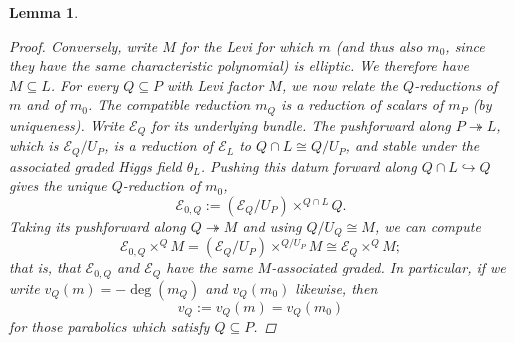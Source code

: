 \documentclass[openany]{amsbook}
\newtheorem{lemma}[theorem]{Lemma}
\theoremstyle{definition}
\theoremstyle{remark}
\numberwithin{equation}{section}
\newcommand{\cE}{\mathcal{E}}
\renewcommand{\-}{\operatorname{-}}
\begin{document}
\begin{lemma}
\begin{proof}
        Conversely, write $M$ for the Levi for which $m$ (and thus also $m_0$, since they have the same characteristic polynomial) is elliptic. We therefore have $M \subseteq L$. For every $Q \subseteq P$ with Levi factor $M$, we now relate the $Q$-reductions of $m$ and of $m_0$. The compatible reduction $m_Q$ is a reduction of scalars of $m_P$ (by uniqueness). Write $\cE_Q$ for its underlying bundle. The pushforward along $P \twoheadrightarrow L$, which is $\cE_Q/U_P$, is a reduction of $\cE_L$ to $Q \cap L \cong Q/U_P$, and stable under the associated graded Higgs field $\theta_L$. Pushing this datum forward along $Q \cap L \hookrightarrow Q$ gives the unique $Q$-reduction of $m_0$,
        $$
            \cE_{0, Q} := (\cE_Q/U_P) \times^{Q \cap L} Q.
        $$
        Taking its pushforward along $Q \twoheadrightarrow M$ and using $Q/U_Q \cong M$, we can compute
        $$
            \cE_{0, Q} \times^Q M = (\cE_Q/U_P) \times^{Q/U_P} M \cong \cE_Q \times^Q M;
        $$
        that is, that $\cE_{0,Q}$ and $\cE_Q$ have the same $M$-associated graded. In particular, if we write $v_Q(m) = -\deg(m_Q)$ and $v_Q(m_0)$ likewise, then
        $$
            v_Q := v_Q(m) = v_Q(m_0)
        $$
        for those parabolics which satisfy $Q \subseteq P$.


\end{proof}
\end{lemma}
\end{document}
